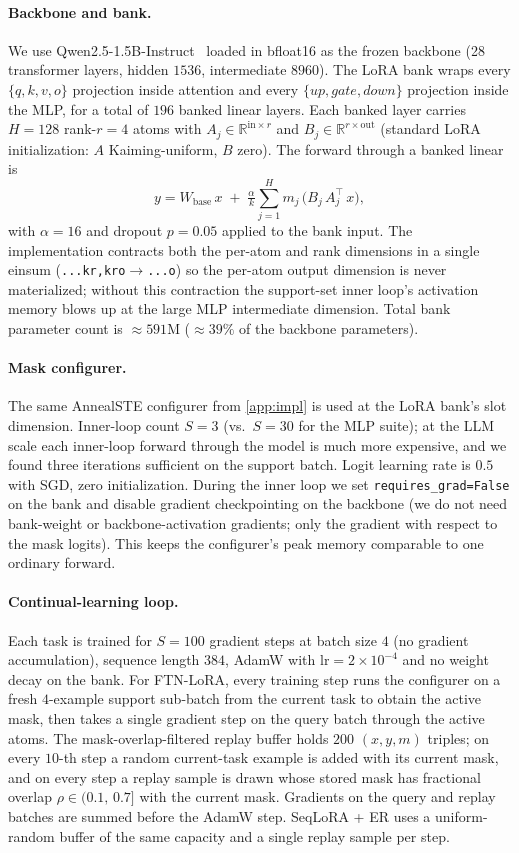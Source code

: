 \documentclass{article}
\begin{document}
\paragraph{Backbone and bank.}
We use Qwen2.5-1.5B-Instruct~\citep{qwen2_5_2024} loaded in bfloat16 as the frozen backbone (28 transformer layers, hidden $1536$, intermediate $8960$). The LoRA bank wraps every $\{q,k,v,o\}$ projection inside attention and every $\{up, gate, down\}$ projection inside the MLP, for a total of $196$ banked linear layers. Each banked layer carries $H=128$ rank-$r=4$ atoms with $A_j\in\mathbb{R}^{\mathrm{in}\times r}$ and $B_j\in\mathbb{R}^{r\times\mathrm{out}}$ (standard LoRA initialization: $A$ Kaiming-uniform, $B$ zero). The forward through a banked linear is
\[
y = W_\mathrm{base}\,x \;+\; \tfrac{\alpha}{k}\sum_{j=1}^{H} m_j\,\bigl(B_j\,A_j^\top\,x\bigr),
\]
with $\alpha=16$ and dropout $p=0.05$ applied to the bank input. The implementation contracts both the per-atom and rank dimensions in a single einsum (\texttt{...kr,kro$\rightarrow$...o}) so the per-atom output dimension is never materialized; without this contraction the support-set inner loop's activation memory blows up at the large MLP intermediate dimension. Total bank parameter count is $\approx\!591$M ($\approx\!39\%$ of the backbone parameters).

\paragraph{Mask configurer.}
The same AnnealSTE configurer from \cref{app:impl} is used at the LoRA bank's slot dimension. Inner-loop count $S=3$ (vs.\ $S=30$ for the MLP suite); at the LLM scale each inner-loop forward through the model is much more expensive, and we found three iterations sufficient on the support batch. Logit learning rate is $0.5$ with SGD, zero initialization. During the inner loop we set \texttt{requires\_grad=False} on the bank and disable gradient checkpointing on the backbone (we do not need bank-weight or backbone-activation gradients; only the gradient with respect to the mask logits). This keeps the configurer's peak memory comparable to one ordinary forward.

\paragraph{Continual-learning loop.}
Each task is trained for $S{=}100$ gradient steps at batch size $4$ (no gradient accumulation), sequence length $384$, AdamW with $\mathrm{lr}=2{\times}10^{-4}$ and no weight decay on the bank. For FTN-LoRA, every training step runs the configurer on a fresh $4$-example support sub-batch from the current task to obtain the active mask, then takes a single gradient step on the query batch through the active atoms. The mask-overlap-filtered replay buffer holds $200$ $(x,y,m)$ triples; on every $10$-th step a random current-task example is added with its current mask, and on every step a replay sample is drawn whose stored mask has fractional overlap $\rho\in(0.1,\,0.7]$ with the current mask. Gradients on the query and replay batches are summed before the AdamW step. SeqLoRA + ER uses a uniform-random buffer of the same capacity and a single replay sample per step.
\end{document}
